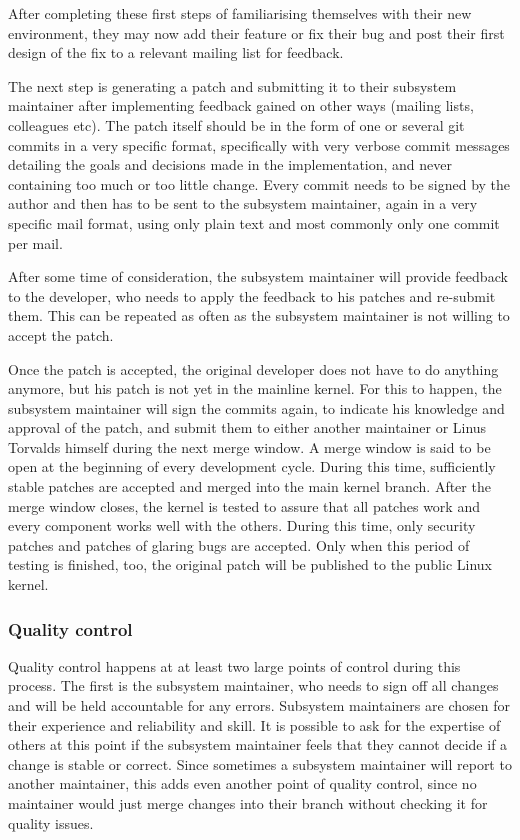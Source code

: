 \documentclass{sig-alternate-05-2015}
\begin{document}
After completing these first steps of familiarising themselves with their new environment, they may now add their feature or fix their bug and post their first design of the fix to a relevant mailing list for feedback.

The next step is generating a patch and submitting it to their subsystem maintainer after implementing feedback gained on other ways (mailing lists, colleagues etc).
The patch itself should be in the form of one or several git commits in a very specific format, specifically with very verbose commit messages detailing the goals and decisions made in the implementation, and never containing too much or too little change.
Every commit needs to be signed by the author and then has to be sent to the subsystem maintainer, again in a very specific mail format, using only plain text and most commonly only one commit per mail.

After some time of consideration, the subsystem maintainer will provide feedback to the developer, who needs to apply the feedback to his patches and re-submit them.
This can be repeated as often as the subsystem maintainer is not willing to accept the patch.

Once the patch is accepted, the original developer does not have to do anything anymore, but his patch is not yet in the mainline kernel.
For this to happen, the subsystem maintainer will sign the commits again, to indicate his knowledge and approval of the patch, and submit them to either another maintainer or Linus Torvalds himself during the next merge window.
A merge window is said to be open at the beginning of every development cycle.
During this time, sufficiently stable patches are accepted and merged into the main kernel branch.
After the merge window closes, the kernel is tested to assure that all patches work and every component works well with the others.
During this time, only security patches and patches of glaring bugs are accepted.
Only when this period of testing is finished, too, the original patch will be published to the public Linux kernel.

\subsubsection{Quality control}

Quality control happens at at least two large points of control during this process.
The first is the subsystem maintainer, who needs to sign off all changes and will be held accountable for any errors.
Subsystem maintainers are chosen for their experience and reliability and skill.
It is possible to ask for the expertise of others at this point if the subsystem maintainer feels that they cannot decide if a change is stable or correct.
Since sometimes a subsystem maintainer will report to another maintainer, this adds even another point of quality control, since no maintainer would just merge changes into their branch without checking it for quality issues.
\end{document}
